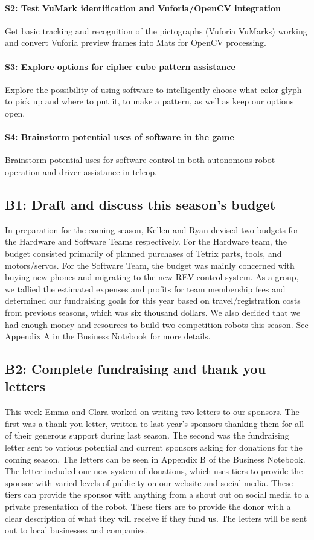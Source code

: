 \documentclass{article}
\begin{document}
\paragraph{S2: Test VuMark identification and Vuforia/OpenCV integration}
Get basic tracking and recognition of the pictographs (Vuforia VuMarks) working and convert Vuforia preview frames into Mats for OpenCV processing.	
\paragraph{S3: Explore options for cipher cube pattern assistance}
Explore the possibility of using software to intelligently choose what color glyph to pick up and where to put it, to make a pattern, as well as keep our options open.
\paragraph{S4: Brainstorm potential uses of software in the game}
Brainstorm potential uses for software control in both autonomous robot operation and driver assistance in teleop.
\newpage
\subsection{B1: Draft and discuss this season's budget}

In preparation for the coming season, Kellen and Ryan devised two budgets for the Hardware and Software Teams respectively. For the Hardware team, the budget consisted primarily of planned purchases of Tetrix parts, tools, and motors/servos. For the Software Team, the budget was mainly concerned with buying new phones and migrating to the new REV control system. As a group, we tallied the estimated expenses and profits for team membership fees and determined our fundraising goals for this year based on travel/registration costs from previous seasons, which was six thousand dollars. We also decided that we had enough money and resources to build two competition robots this season. See Appendix A in the Business Notebook for more details.

\subsection{B2: Complete fundraising and thank you letters}

This week Emma and Clara worked on writing two letters to our sponsors.  The first was a thank you letter, written to last year's sponsors thanking them for all of their generous support during last season. The second was the fundraising letter sent to various potential and current sponsors asking for donations for the coming season. The letters can be seen in Appendix B of the Business Notebook. The letter included our new system of donations, which uses tiers to provide the sponsor with varied levels of publicity on our website and social media. These tiers can provide the sponsor with anything from a shout out on social media to a private presentation of the robot.  These tiers are to provide the donor with a clear description of what they will receive if they fund us. The letters will be sent out to local businesses and companies. 
\end{document}
